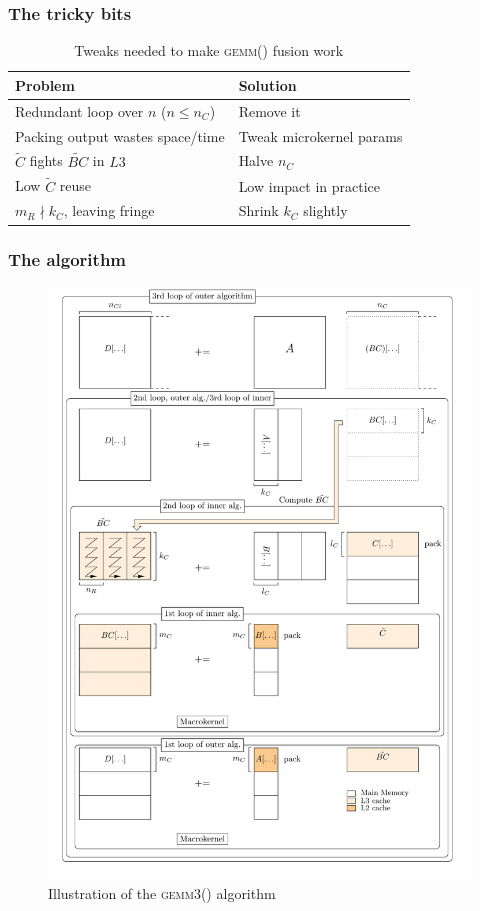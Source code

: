 \documentclass{beamer}
\newcommand*{\gemmt}{{\textsc{gemm3()}}}
\newcommand*{\gemm}{{\textsc{gemm()}}}
\begin{document}
\begin{frame}
  \frametitle{The tricky bits}
  \begin{table}
    \centering
    \begin{tabular}{l|l}
      Problem&Solution\\ \hline \hline
      Redundant loop over $n$ ($n \leq n_C$) & Remove it\\
      Packing output wastes space/time & Tweak microkernel params\\
      $\tilde{C}$ fights $\tilde{BC}$ in $L3$ & Halve $n_C$\\
      Low $\tilde{C}$ reuse & Low impact in practice\\
      $m_R \nmid k_C$, leaving fringe & Shrink $k_C$ slightly\\
    \end{tabular}
    \caption{Tweaks needed to make \gemm{} fusion work}
    \label{tab:gemm3-issues}
  \end{table}
\end{frame}

\begin{frame}
  \frametitle{The algorithm}
  \begin{figure}
    \centering
    \includegraphics[height=0.875\textheight]{gemm3-picture}
    \caption{Illustration of the \gemmt{} algorithm}
    \label{fig:gemm3}
\end{figure}
\end{frame}
\end{document}
